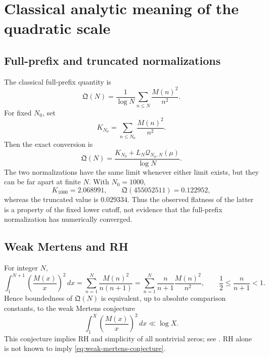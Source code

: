 \documentclass[11pt,reqno]{amsart}
\numberwithin{equation}{section}
\theoremstyle{plain}
\theoremstyle{definition}
\theoremstyle{remark}
\newcommand{\QF}{\mathcal Q}
\begin{document}
\section{Classical analytic meaning of the quadratic scale}
\label{sec:analytic-meaning}

\subsection{Full-prefix and truncated normalizations}
\label{subsec:normalization-comparison}

The classical full-prefix quantity is
\begin{equation}
\mathfrak Q(N)
=\frac{1}{\log N}\sum_{n\leq N}\frac{M(n)^2}{n^2}.
\label{eq:full-prefix-quadratic-mass}
\end{equation}
For fixed \(N_0\), set
\begin{equation}
K_{N_0}=\sum_{n\leq N_0}\frac{M(n)^2}{n^2}.
\label{eq:prefix-constant}
\end{equation}
Then the exact conversion is
\begin{equation}
\mathfrak Q(N)
=\frac{K_{N_0}+L_N\QF_{N_0,N}(\mu)}{\log N}.
\label{eq:normalization-conversion}
\end{equation}
The two normalizations have the same limit whenever either limit exists, but
they can be far apart at finite \(N\).  With \(N_0=1000\),
\begin{equation}
K_{1000}=2.068991,\qquad
\mathfrak Q(455052511)=0.122952,
\label{eq:prefix-numerical-values}
\end{equation}
whereas the truncated value is \(0.029334\).  Thus the observed flatness of
the latter is a property of the fixed lower cutoff, not evidence that the
full-prefix normalization has numerically converged.

\subsection{Weak Mertens and RH}
\label{subsec:weak-mertens-rh}

For integer \(N\),
\begin{equation}
\int_1^{N+1}\left(\frac{M(x)}{x}\right)^2\,dx
=\sum_{n=1}^{N}\frac{M(n)^2}{n(n+1)}
=\sum_{n=1}^{N}\frac{n}{n+1}\frac{M(n)^2}{n^2},
\qquad \frac12\leq\frac{n}{n+1}<1.
\label{eq:discrete-continuous-comparison}
\end{equation}
Hence boundedness of \(\mathfrak Q(N)\) is equivalent, up to absolute
comparison constants, to the weak Mertens conjecture
\begin{equation}
\int_1^X\left(\frac{M(x)}{x}\right)^2\,dx\ll\log X.
\label{eq:weak-mertens-conjecture}
\end{equation}
This conjecture implies RH and simplicity of all nontrivial zeros; see
\cite{Titchmarsh1986,OdlyzkoTeRiele1985,Ng2004}.  RH alone is not known to
imply \eqref{eq:weak-mertens-conjecture}.
\end{document}
